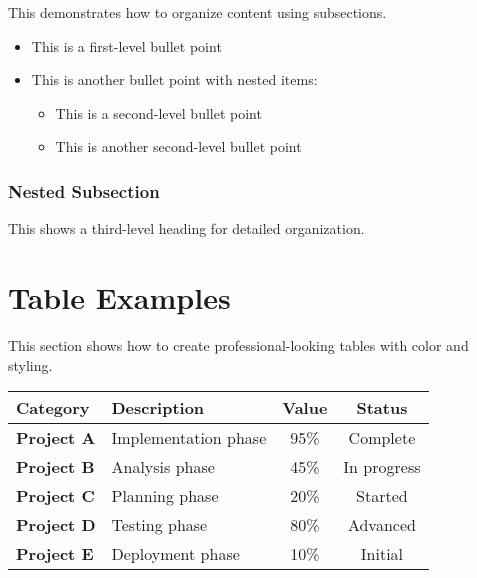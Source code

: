 \documentclass[a4paper,11pt]{article}
\begin{document}
This demonstrates how to organize content using subsections.

\begin{itemize}
    \item This is a first-level bullet point
    \item This is another bullet point with nested items:
    \begin{itemize}
        \item This is a second-level bullet point
        \item This is another second-level bullet point
    \end{itemize}
\end{itemize}

\subsubsection{Nested Subsection}

This shows a third-level heading for detailed organization.

\section{Table Examples}

This section shows how to create professional-looking tables with color and styling.

\begin{tcolorbox}[colback=cardbg, colframe=frameborder, coltitle=white,
    fonttitle=\bfseries, title=📊 Data Analysis Results,
    enhanced, boxrule=0.5pt, arc=4pt, left=10pt, right=10pt, top=8pt, bottom=8pt,
    attach boxed title to top left={xshift=10pt, yshift=-2mm},
    boxed title style={colback=accent, arc=2pt}
]


\begin{tabularx}{\linewidth}{>{\raggedright\arraybackslash\bfseries}X >{\raggedright\arraybackslash}X c c}
    \rowcolor{headerbg}
    \textcolor{headertext}{Category} &
    \textcolor{headertext}{Description} &
    \textcolor{headertext}{Value} &
    \textcolor{headertext}{Status} \\
    \toprule
    Project A & Implementation phase & 95\% & Complete  \\
    Project B & Analysis phase & 45\% & In progress \\
    Project C & Planning phase & 20\% & Started \\
    Project D & Testing phase & 80\% & Advanced \\
    Project E & Deployment phase & 10\% & Initial \\
    \bottomrule
\end{tabularx}

\end{tcolorbox}
\end{document}
